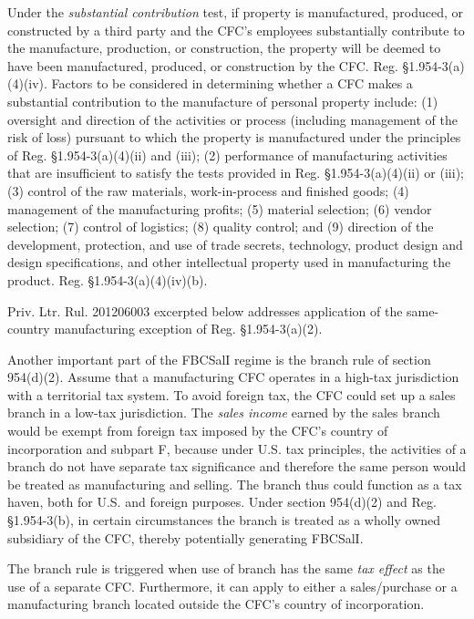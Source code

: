 	Under the \emph{substantial contribution} test, if property is manufactured, produced, or constructed by a third party and the CFC's employees substantially contribute to the manufacture, production, or construction, the property will be deemed to have been manufactured, produced, or construction by the CFC.  Reg. \S 1.954-3(a)(4)(iv).  Factors to be considered in determining whether a CFC makes a substantial contribution to the manufacture of personal property include: (1) oversight and direction of the activities or process (including management of the risk of loss) pursuant to which the property is manufactured under the principles of Reg. \S 1.954-3(a)(4)(ii) and (iii); (2) performance of manufacturing activities that are insufficient to satisfy the tests provided in Reg. \S 1.954-3(a)(4)(ii) or (iii); (3) control of the raw materials, work-in-process and finished goods; (4) management of the manufacturing profits; (5) material selection; (6) vendor selection; (7) control of logistics; (8) quality control; and (9) direction of the development, protection, and use of trade secrets, technology, product design and design specifications, and other intellectual property used in manufacturing the product.  Reg. \S 1.954-3(a)(4)(iv)(b).  
	
	Priv. Ltr. Rul. 201206003 excerpted below addresses application of the same-country manufacturing exception of Reg. \S1.954-3(a)(2). 

	Another important part of the FBCSalI regime is the branch rule of section 954(d)(2).   Assume that a manufacturing CFC operates in a high-tax jurisdiction with a territorial tax system.  To avoid foreign tax, the CFC could set up a sales branch in a low-tax jurisdiction.  The \emph{sales income} earned by the sales branch would be exempt from foreign tax imposed by the CFC's country of incorporation and subpart F, because under U.S. tax principles, the activities of a branch do not have separate tax significance and therefore the same person would be treated as manufacturing and selling.  The branch thus could function as a tax haven, both for U.S. and foreign purposes.  Under section 954(d)(2) and Reg. \S 1.954-3(b), in certain circumstances the branch is treated as a wholly owned subsidiary of the CFC, thereby potentially generating FBCSalI.
	
	The branch rule is triggered when use of branch has the same \emph{tax effect} as the use of a separate CFC.   Furthermore, it can apply to either a sales/purchase or a manufacturing branch located outside the CFC's country of incorporation.  
	
